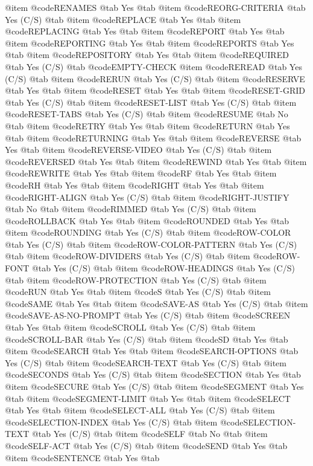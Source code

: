 @item @code{RENAMES} @tab Yes @tab 
@item @code{REORG-CRITERIA} @tab Yes	(C/S) @tab 
@item @code{REPLACE} @tab Yes @tab 
@item @code{REPLACING} @tab Yes @tab 
@item @code{REPORT} @tab Yes @tab 
@item @code{REPORTING} @tab Yes @tab 
@item @code{REPORTS} @tab Yes @tab 
@item @code{REPOSITORY} @tab Yes @tab 
@item @code{REQUIRED} @tab Yes	(C/S) @tab @code{EMPTY-CHECK}
@item @code{REREAD} @tab Yes	(C/S) @tab 
@item @code{RERUN} @tab Yes	(C/S) @tab 
@item @code{RESERVE} @tab Yes @tab 
@item @code{RESET} @tab Yes @tab 
@item @code{RESET-GRID} @tab Yes	(C/S) @tab 
@item @code{RESET-LIST} @tab Yes	(C/S) @tab 
@item @code{RESET-TABS} @tab Yes	(C/S) @tab 
@item @code{RESUME} @tab No @tab 
@item @code{RETRY} @tab Yes @tab 
@item @code{RETURN} @tab Yes @tab 
@item @code{RETURNING} @tab Yes @tab 
@item @code{REVERSE} @tab Yes @tab 
@item @code{REVERSE-VIDEO} @tab Yes	(C/S) @tab 
@item @code{REVERSED} @tab Yes @tab 
@item @code{REWIND} @tab Yes @tab 
@item @code{REWRITE} @tab Yes @tab 
@item @code{RF} @tab Yes @tab 
@item @code{RH} @tab Yes @tab 
@item @code{RIGHT} @tab Yes @tab 
@item @code{RIGHT-ALIGN} @tab Yes	(C/S) @tab 
@item @code{RIGHT-JUSTIFY} @tab No @tab 
@item @code{RIMMED} @tab Yes	(C/S) @tab 
@item @code{ROLLBACK} @tab Yes @tab 
@item @code{ROUNDED} @tab Yes @tab 
@item @code{ROUNDING} @tab Yes	(C/S) @tab 
@item @code{ROW-COLOR} @tab Yes	(C/S) @tab 
@item @code{ROW-COLOR-PATTERN} @tab Yes	(C/S) @tab 
@item @code{ROW-DIVIDERS} @tab Yes	(C/S) @tab 
@item @code{ROW-FONT} @tab Yes	(C/S) @tab 
@item @code{ROW-HEADINGS} @tab Yes	(C/S) @tab 
@item @code{ROW-PROTECTION} @tab Yes	(C/S) @tab 
@item @code{RUN} @tab Yes @tab 
@item @code{S} @tab Yes	(C/S) @tab 
@item @code{SAME} @tab Yes @tab 
@item @code{SAVE-AS} @tab Yes	(C/S) @tab 
@item @code{SAVE-AS-NO-PROMPT} @tab Yes	(C/S) @tab 
@item @code{SCREEN} @tab Yes @tab 
@item @code{SCROLL} @tab Yes	(C/S) @tab 
@item @code{SCROLL-BAR} @tab Yes	(C/S) @tab 
@item @code{SD} @tab Yes @tab 
@item @code{SEARCH} @tab Yes @tab 
@item @code{SEARCH-OPTIONS} @tab Yes	(C/S) @tab 
@item @code{SEARCH-TEXT} @tab Yes	(C/S) @tab 
@item @code{SECONDS} @tab Yes	(C/S) @tab 
@item @code{SECTION} @tab Yes @tab 
@item @code{SECURE} @tab Yes	(C/S) @tab 
@item @code{SEGMENT} @tab Yes @tab 
@item @code{SEGMENT-LIMIT} @tab Yes @tab 
@item @code{SELECT} @tab Yes @tab 
@item @code{SELECT-ALL} @tab Yes	(C/S) @tab 
@item @code{SELECTION-INDEX} @tab Yes	(C/S) @tab 
@item @code{SELECTION-TEXT} @tab Yes	(C/S) @tab 
@item @code{SELF} @tab No @tab 
@item @code{SELF-ACT} @tab Yes	(C/S) @tab 
@item @code{SEND} @tab Yes @tab 
@item @code{SENTENCE} @tab Yes @tab 
